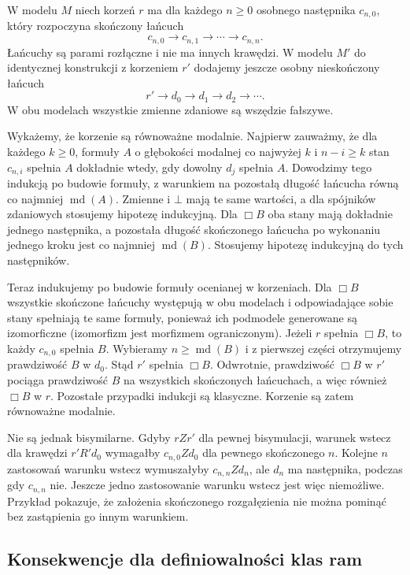 \begin{przyklad}
\label{ex:ncl-kripke-infinite-branching}
W modelu $M$ niech korzeń $r$ ma dla każdego
$n\geq0$ osobnego następnika $c_{n,0}$,
który rozpoczyna skończony łańcuch
\[
 c_{n,0}\to c_{n,1}\to\cdots\to c_{n,n}.
\]
Łańcuchy są parami rozłączne i nie ma innych
krawędzi. W modelu $M'$ do identycznej
konstrukcji z korzeniem $r'$ dodajemy
jeszcze osobny nieskończony łańcuch
\[
 r'\to d_0\to d_1\to d_2\to\cdots .
\]
W obu modelach wszystkie zmienne zdaniowe
są wszędzie fałszywe.

Wykażemy, że korzenie są równoważne modalnie.
Najpierw zauważmy, że dla każdego $k\geq0$,
formuły $A$ o głębokości modalnej co najwyżej
$k$ i $n-i\geq k$ stan $c_{n,i}$ spełnia
$A$ dokładnie wtedy, gdy dowolny $d_j$
spełnia $A$. Dowodzimy tego indukcją po
budowie formuły, z warunkiem na pozostałą
długość łańcucha równą co najmniej
$\operatorname{md}(A)$.
Zmienne i $\bot$ mają te same wartości,
a dla spójników zdaniowych stosujemy
hipotezę indukcyjną. Dla $\Box B$ oba
stany mają dokładnie jednego następnika,
a pozostała długość skończonego łańcucha
po wykonaniu jednego kroku jest co najmniej
$\operatorname{md}(B)$. Stosujemy hipotezę
indukcyjną do tych następników.

Teraz indukujemy po budowie formuły
ocenianej w korzeniach. Dla $\Box B$
wszystkie skończone łańcuchy występują
w obu modelach i odpowiadające sobie stany
spełniają te same formuły, ponieważ ich
podmodele generowane są izomorficzne
(izomorfizm jest morfizmem ograniczonym).
Jeżeli $r$ spełnia $\Box B$, to każdy
$c_{n,0}$ spełnia $B$. Wybieramy
$n\geq\operatorname{md}(B)$ i z pierwszej
części otrzymujemy prawdziwość $B$ w $d_0$.
Stąd $r'$ spełnia $\Box B$. Odwrotnie,
prawdziwość $\Box B$ w $r'$ pociąga
prawdziwość $B$ na wszystkich skończonych
łańcuchach, a więc również $\Box B$ w $r$.
Pozostałe przypadki indukcji są klasyczne.
Korzenie są zatem równoważne modalnie.

Nie są jednak bisymilarne. Gdyby $rZr'$
dla pewnej bisymulacji, warunek wstecz
dla krawędzi $r'R'd_0$ wymagałby
$c_{n,0}Zd_0$ dla pewnego skończonego $n$.
Kolejne $n$ zastosowań warunku wstecz
wymuszałyby $c_{n,n}Zd_n$, ale $d_n$
ma następnika, podczas gdy $c_{n,n}$ nie.
Jeszcze jedno zastosowanie warunku wstecz
jest więc niemożliwe.
Przykład pokazuje, że założenia skończonego
rozgałęzienia nie można pominąć bez
zastąpienia go innym warunkiem.
\end{przyklad}

\subsection{Konsekwencje dla definiowalności klas ram}

